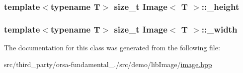 \subsubsection[{\+\_\+height}]{\setlength{\rightskip}{0pt plus 5cm}template$<$typename T$>$ size\+\_\+t {\bf Image}$<$ T $>$\+::\+\_\+height\hspace{0.3cm}{\ttfamily [protected]}}\label{classImage_a29f681d826e113d2c4b20d91577ee9ae}
\hypertarget{classImage_ac8b95e3c2a725ef222ba9b84c9fe92b1}{}
\subsubsection[{\+\_\+width}]{\setlength{\rightskip}{0pt plus 5cm}template$<$typename T$>$ size\+\_\+t {\bf Image}$<$ T $>$\+::\+\_\+width\hspace{0.3cm}{\ttfamily [protected]}}\label{classImage_ac8b95e3c2a725ef222ba9b84c9fe92b1}


The documentation for this class was generated from the following file\+:\begin{DoxyCompactItemize}
\item 
src/third\+\_\+party/orsa-\/fundamental\+\_./src/demo/lib\+Image/\hyperlink{image_8hpp}{image.\+hpp}\end{DoxyCompactItemize}
